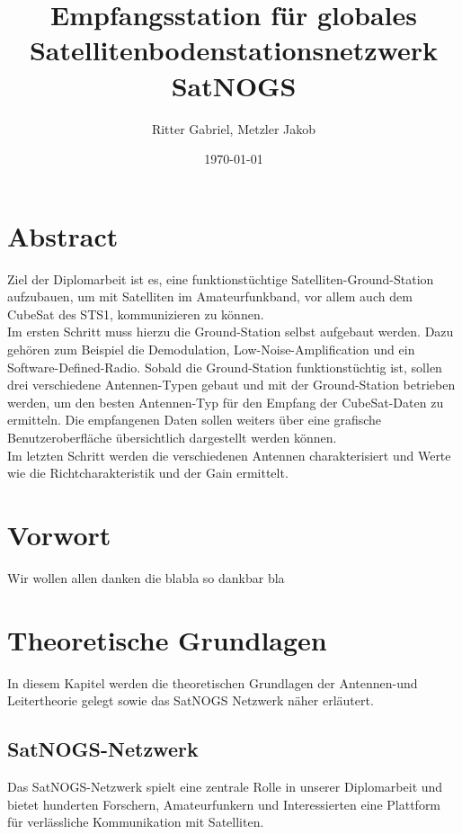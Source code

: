 \documentclass[12pt]{scrreprt}
\title{Empfangsstation für globales Satellitenbodenstationsnetzwerk SatNOGS}
\author{Ritter Gabriel, Metzler Jakob}
\date{\today}
\begin{document}
	
	\maketitle
	
	\chapter{Abstract}
	
	
	
	Ziel der Diplomarbeit ist es, eine funktionstüchtige Satelliten-Ground-Station aufzubauen, um mit 
	Satelliten im Amateurfunkband, vor allem auch dem CubeSat des STS1, kommunizieren zu können.\\
	
	
	Im ersten Schritt muss hierzu die Ground-Station selbst aufgebaut werden. Dazu gehören zum 
	Beispiel die Demodulation, Low-Noise-Amplification und ein Software-Defined-Radio. Sobald die 
	Ground-Station funktionstüchtig ist, sollen drei verschiedene Antennen-Typen gebaut und mit der 
	Ground-Station betrieben werden, um den besten Antennen-Typ für den Empfang der CubeSat-Daten zu ermitteln. Die empfangenen Daten sollen weiters über eine grafische Benutzeroberfläche 
	übersichtlich dargestellt werden können.\\
	
	
	Im letzten Schritt werden die verschiedenen Antennen charakterisiert und Werte wie die Richtcharakteristik und der Gain ermittelt.
	
	\chapter{Vorwort}
	Wir wollen allen danken die blabla so dankbar bla
	
	\tableofcontents
	\pagebreak
	
	\chapter{Theoretische Grundlagen}
	In diesem Kapitel werden die theoretischen Grundlagen der Antennen-und Leitertheorie gelegt sowie das SatNOGS Netzwerk näher erläutert.
	
	\section{SatNOGS-Netzwerk}
	Das SatNOGS-Netzwerk spielt eine zentrale Rolle in unserer Diplomarbeit und bietet hunderten Forschern, Amateurfunkern und Interessierten eine Plattform für verlässliche Kommunikation mit Satelliten.\\
	
\end{document}
